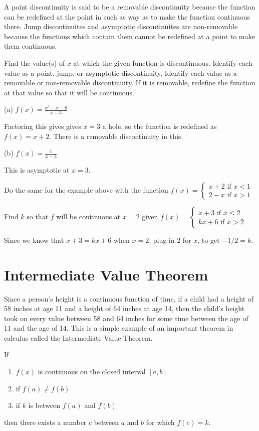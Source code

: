 \documentclass[../bccalc.tex]{subfiles}
\begin{document}
A point discontinuity is said to be a removable discontinuity because the function can be redefined at the point in such as way as to make the function continuous there.
Jump discontinuites and asymptotic discontinuites are non-removable because the functions which contain them cannot be redefined at a point to make them continuous.

\begin{example}
    Find the value(s) of $x$ at which the given function is discontinuous. Identify each value as a point, jump, or asymptotic discontinuity. Identify each value as a removable or non-removable discontinuity. If it is removable, redefine the function at that value so that it will be continuous.

    (a) $f(x)=\frac{x^2-x-6}{x-3}$

    Factoring this gives gives $x=3$ a hole, so the function is redefined as $f(x)=x+2$. There is a removable discontinuity in this.

    (b) $f(x)=\frac{1}{x-3}$

    This is asymptotic at $x=3$.
\end{example}

\ex Do the same for the example above with the function $f(x)=\begin{cases}
    x+2 \text{ if } x<1\\
    2-x \text{ if } x>1
\end{cases}$

\begin{example}
    Find $k$ so that $f$ will be continuous at $x=2$ given $f(x)=\begin{cases}
        x+3 \text{ if } x\leq 2 \\
        kx+6 \text{ if }x>2
    \end{cases}$

    Since we know that $x+3=kx+6$ when $x=2$, plug in $2$ for $x$, to get $-1/2=k$.
\end{example}

\pagebreak
\section{Intermediate Value Theorem}
Since a person's height is a continuous function of time, if a child had a height of 58 inches at age 11 and a height of 64 inches at age 14, then the child's height took on every value between 58 and 64 inches for some time between the age of 11 and the age of 14. This is a simple example of an important theorem in calculus called the Intermediate Value Theorem.
\begin{theorem}
    If \begin{enumerate}
        \item $f(x)$ is continuous on the closed interval $[a,b]$
        \item if $f(a)\neq f(b)$
        \item if $k$ is between $f(a)$ and $f(b)$
    \end{enumerate}
    then there exists a number $c$ between $a$ and $b$ for which $f(c)=k$.
\end{theorem}
\end{document}

